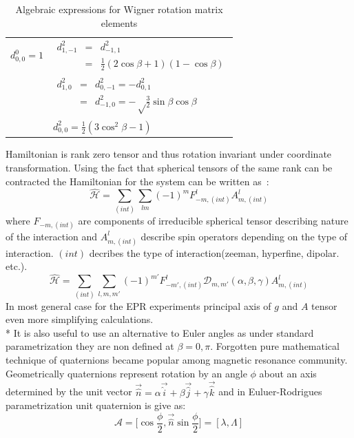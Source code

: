 \begin{table}
\begin{center}
\begin{tabular}{  l | l }
     $d^{0}_{0,0}=1$ & $\begin{array} {lcl} d^{2}_{1,-1} & = & d^{2}_{-1,1} \\ & = & \frac{1}{2}(2\cos\beta+1)(1-\cos\beta) \end{array}$ \\ 
      & $\begin{array} {lcl} d^{2}_{1,0} & = & d^{2}_{0,-1}=-d^{2}_{0,1} \\ & = & d^{2}_{-1,0}=-\sqrt\frac{3}{2}\sin\beta\cos\beta \end{array}$ \\ 
      & $d^{2}_{0,0}=\frac{1}{2}(3\cos^2\beta-1)$ \\ \hline
   
    \end{tabular} 
\end{center}
\caption{Algebraic expressions for Wigner rotation matrix elements}
  \label{tab:wigner}
 \end{table}
Hamiltonian is rank zero tensor and thus rotation invariant under coordinate transformation. Using the fact that spherical tensors of the same rank can be contracted the Hamiltonian for the system can be written as~\cite{nordio}:
\begin{equation}\label{eq:46}
  \mathcal{\hat{H}}=\sum_{(int)}\sum_{lm}(-1)^mF_{-m,(int)}^lA_{m,(int)}^l
\end{equation}
where $F_{-m,(int)}$ are components of irreducible spherical tensor describing nature of the interaction and 
$A_{m,(int)}^l$ describe spin operators depending on the type of interaction. $(int)$ decribes the type of interaction(zeeman, hyperfine, dipolar. etc.). 
\begin{equation}\label{eq:47}
  \mathcal{\hat{H}}=\sum_{(int)}\sum_{l,m,m'}(-1)^{m'}F_{-m',(int)}^l\mathcal{D}_{m,m'}(\alpha,\beta,\gamma)A_{m,(int)}^l
\end{equation}
In most general case for the EPR experiments principal axis of $g$ and $A$ tensor even more simplifying  calculations. \\*
It is also useful to use an alternative to Euler angles as under standard parametrization they are non defined at $\beta=0,\pi$. Forgotten pure mathematical technique of quaternions became popular among magnetic resonance community. Geometrically quaternions represent rotation by an angle $\phi$ about an axis determined by the unit vector $\vec{\hat{n}}=\alpha \vec{\hat{i}}+\beta \vec{\hat{j}}+\gamma \vec{\hat{k}}$ and in Euluer-Rodrigues parametrization unit quaternion is give as:
\begin{equation}\label{eq:quat}
\mathcal{A}=\Big[\cos\frac{\phi}{2},\vec{\hat{n}}\sin\frac{\phi}{2}\Big]=[\lambda,\Lambda]
\end{equation}
